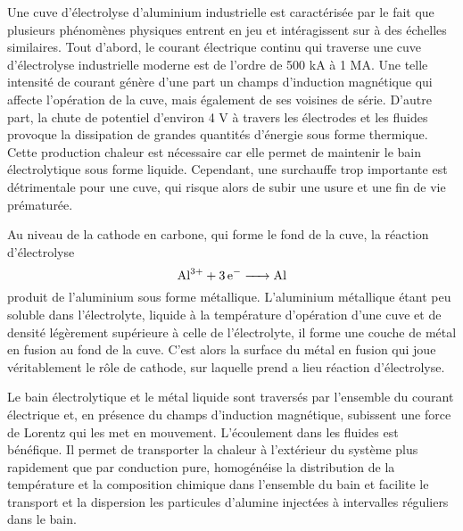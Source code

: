 Une cuve d'électrolyse d'aluminium industrielle est caractérisée par
le fait que plusieurs phénomènes physiques entrent en jeu et
intéragissent sur à des échelles similaires. Tout d'abord, le courant
électrique continu qui traverse une cuve d'électrolyse industrielle
moderne est de l'ordre de \num{500} \si{\kilo\ampere} à \num{1}
\si{\mega\ampere}. Une telle intensité de courant génère d'une part un
champs d'induction magnétique qui affecte l'opération de la
cuve, mais également de ses voisines de série. D'autre part, la chute
de potentiel d'environ \num{4} \si{\volt} à travers les électrodes et
les fluides provoque la dissipation de grandes quantités d'énergie
sous forme thermique. Cette production chaleur est nécessaire car elle
permet de maintenir le bain électrolytique sous forme
liquide. Cependant, une surchauffe trop importante est détrimentale
pour une cuve, qui risque alors de subir une usure et une fin de vie
prématurée.

Au niveau de la cathode en carbone, qui forme le fond de la cuve, la
réaction d'électrolyse
\begin{equation}
\cee{Al^{3+} + 3e^- -> Al}
\end{equation}
produit de l'aluminium sous forme métallique. L'aluminium métallique étant
peu soluble dans l'électrolyte, liquide à la température
d'opération d'une cuve et de densité légèrement supérieure à celle de
l'électrolyte, il forme une couche de métal en fusion au fond de la
cuve. C'est alors la surface du métal en fusion qui joue
véritablement le rôle de cathode, sur laquelle prend a lieu
réaction d'électrolyse.

Le bain électrolytique et le métal liquide sont traversés par
l'ensemble du courant électrique et, en présence du champs d'induction
magnétique, subissent une force de Lorentz qui les met en
mouvement. L'écoulement dans les fluides est bénéfique. Il permet de
transporter la chaleur à l'extérieur du système plus rapidement que
par conduction pure, homogénéise la distribution de la température et
la composition chimique dans l'ensemble du bain et facilite le
transport et la dispersion les particules d'alumine injectées à
intervalles réguliers dans le bain.

